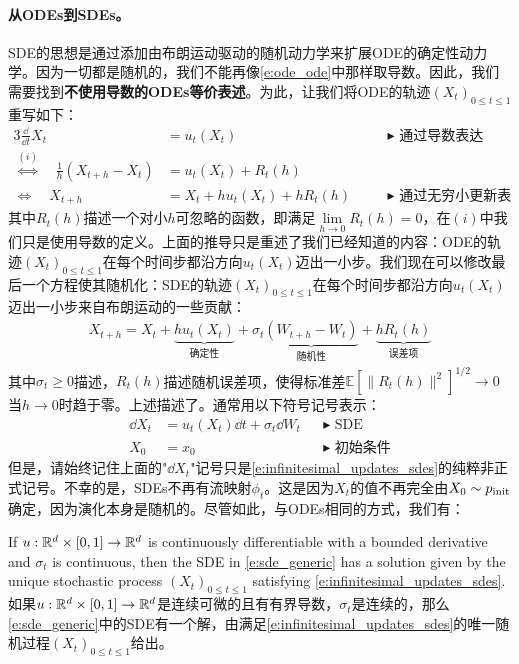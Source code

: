\paragraph{从ODEs到SDEs。} SDE的思想是通过添加由布朗运动驱动的随机动力学来扩展ODE的确定性动力学。因为一切都是随机的，我们不能再像\cref{e:ode_ode}中那样取导数。因此，我们需要找到\textbf{不使用导数的ODEs等价表述}。为此，让我们将ODE的轨迹$(X_t)_{0\leq t\leq 1}$重写如下：
\begin{alignat*}{3}
    \frac{\dd}{\dd t} X_t &=  u_t(X_t) \quad &&\blacktriangleright\,\,\text{通过导数表达}\\
    \overset{(i)}{\Leftrightarrow} \quad  \frac{1}{h}\left(X_{t+h}-X_{t}\right)&=u_t(X_t) + R_t(h)&&\\
\Leftrightarrow \quad X_{t+h} &= X_{t}+hu_t(X_t) + hR_t(h)\quad &&\blacktriangleright\,\,\text{通过无穷小更新表达}
\end{alignat*}
其中$R_t(h)$描述一个对小$h$可忽略的函数，即满足$\lim\limits_{h\to 0}R_t(h)=0$，在$(i)$中我们只是使用导数的定义。上面的推导只是重述了我们已经知道的内容：ODE的轨迹$(X_t)_{0 \le t \le 1}$在每个时间步都沿方向$u_t(X_t)$迈出一小步。我们现在可以修改最后一个方程使其随机化：SDE的轨迹$(X_t)_{0 \le t \le 1}$在每个时间步都沿方向$u_t(X_t)$迈出一小步来自布朗运动的一些贡献：
\begin{align}
    X_{t+h} = X_{t}+\underbrace{hu_t(X_t)}_{\text{确定性}} + \sigma_t\underbrace{(W_{t+h}-W_{t})}_{\text{随机性}}+\underbrace{hR_t(h)}_{\text{误差项}}
\end{align}
其中$\sigma_t\geq 0$描述，$R_t(h)$描述随机误差项，使得标准差$\mathbb{E}[\|R_t(h)\|^2]^{1/2}\to 0$当$h\to 0$时趋于零。上述描述了。通常用以下符号记号表示：
\begin{subequations}
    \begin{align} 
      \dd X_t &= u_t(X_t)\dd t + \sigma_t\dd W_t &&\blacktriangleright\,\,\text{SDE}\\
      X_0 &= x_0               &&\blacktriangleright\,\,\text{初始条件}
    \end{align}
\end{subequations}
但是，请始终记住上面的"$\dd X_t$"记号只是\cref{e:infinitesimal_updates_sdes}的纯粹非正式记号。不幸的是，SDEs不再有流映射$\phi_t$。这是因为$X_t$的值不再完全由$X_0\sim p_{\rm{init}}$确定，因为演化本身是随机的。尽管如此，与ODEs相同的方式，我们有：
\begin{theorem}
    
\label{thm:sde_existence_and_uniqueness}
If $u:\mathbb{R}^d\times[0,1]\to\mathbb{R}^d$ is continuously differentiable with a bounded derivative and $\sigma_t$ is continuous, then the SDE in \eqref{e:sde_generic} has a solution given by the unique stochastic process $(X_t)_{0\leq t\leq 1}$ satisfying \cref{e:infinitesimal_updates_sdes}.
\\如果$u:\mathbb{R}^d\times[0,1]\to\mathbb{R}^d$是连续可微的且有有界导数，$\sigma_t$是连续的，那么\eqref{e:sde_generic}中的SDE有一个解，由满足\cref{e:infinitesimal_updates_sdes}的唯一随机过程$(X_t)_{0\leq t\leq 1}$给出。
\end{theorem}
